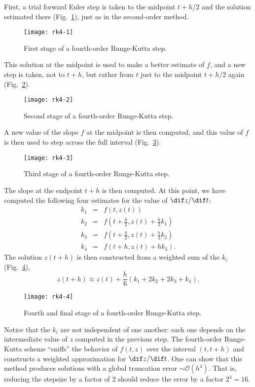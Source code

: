 First, a trial forward Euler step is taken to the midpoint $t+h/2$ and the solution estimated there (Fig.~\ref{f.rk4-1}), just as in the second-order method.
\begin{figure}
\texttt{[image: rk4-1]}
\caption{First stage of a fourth-order Runge-Kutta step.\label{f.rk4-1}}
\end{figure}


This solution at the midpoint is used to make a better estimate of $f$, and a new step is taken, not to $t+h$, but rather from $t$ just to the midpoint $t+h/2$ again (Fig.~\ref{f.rk4-2}).
\begin{figure}
\texttt{[image: rk4-2]}
\caption{Second stage of a fourth-order Runge-Kutta step.\label{f.rk4-2}}
\end{figure}

A new value of the slope $f$ at the midpoint is then computed, and this value of $f$ is then used to step across the full interval (Fig.~\ref{f.rk4-3}).
\begin{figure}
\texttt{[image: rk4-3]}
\caption{Third stage of a fourth-order Runge-Kutta step.\label{f.rk4-3}}
\end{figure}

The slope at the endpoint $t+h$ is then computed. At this point, we have computed the following four estimates for the value of $\dif z/\dif t$:
\begin{eqnarray}
k_{1} &=& f(t,z(t)) \\
k_{2} &=& f\left(t+\frac{h}{2}, z(t) + \frac{h}{2}k_{1}\right)\\
k_{3} &=& f\left(t+\frac{h}{2},z(t) + \frac{h}{2}k_{2}\right)\\
k_{4} &=& f\left(t + h, z(t) + hk_{3}\right).
\end{eqnarray}
The solution $z(t+h)$ is then constructed from a weighted sum of the $k_{i}$ (Fig.~\ref{f.rk4-4}),
\begin{equation}\label{e.rk4}
	z(t+h) \approx z(t) + \frac{h}{6}\left(k_{1} + 2k_{2} + 2k_{3} + k_{4}\right).
\end{equation}
\begin{figure}
\texttt{[image: rk4-4]}
\caption{Fourth and final stage of a fourth-order Runge-Kutta step.\label{f.rk4-4}}
\end{figure}

Notice that the $k_{i}$ are not independent of one another: each one depends on the intermediate value of $z$ computed in the previous step. The fourth-order Runge-Kutta scheme ``sniffs'' the behavior of $f(t,z)$ over the interval $(t,t+h)$ and constructs a weighted approximation for $\dif z/\dif t$.  One can show that this method produces solutions with a global truncation error $\sim\mathcal{O}(h^{4})$. That is, reducing the stepsize by a factor of 2 should reduce the error by a factor $2^{4} = 16$.

